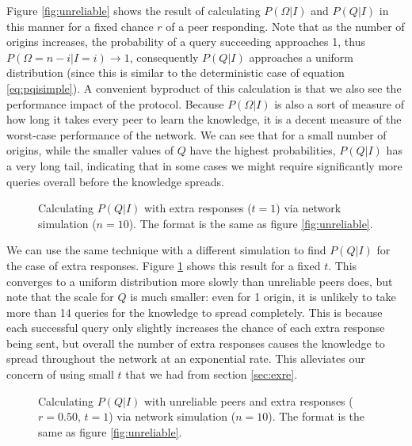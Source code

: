 \documentclass{article}
\newcommand{\eqnref}[1]{equation \eqref{eq:#1}}
\newcommand{\secref}[1]{section \ref{sec:#1}}
\newcommand{\figref}[1]{figure \ref{fig:#1}}
\newcommand{\Figref}[1]{Figure \ref{fig:#1}}
\begin{document}
\Figref{unreliable} shows the result of
calculating $P(\Omega|I)$ and $P(Q|I)$ in this manner for a fixed chance $r$ of
a peer responding. Note that as the number of origins increases, the probability
of a query succeeding approaches 1, thus $P(\Omega=n-i|I=i)\rightarrow 1$,
consequently $P(Q|I)$ approaches a uniform distribution (since this is similar
to the deterministic case of \eqnref{pqisimple}). A convenient byproduct of this
calculation is that we also see the performance impact of the protocol.
Because $P(\Omega|I)$ is also a sort of measure of how long it takes every peer
to learn the knowledge, it is a decent measure of the worst-case performance of
the network. We can see that for a small number of origins, while the smaller
values of $Q$ have the highest probabilities, $P(Q|I)$ has a very long tail,
indicating that in some cases we might require significantly more queries
overall before the knowledge spreads.

\begin{figure}%
    \centering
	\caption{Calculating $P(Q|I)$ with extra responses ($t=1$) via network
	simulation ($n=10$). The format is the same as \figref{unreliable}.}
    \label{fig:exre}%
\end{figure}

We can use the same technique with a different simulation to find $P(Q|I)$ for
the case of extra responses. \Figref{exre} shows this result for a fixed $t$.
This converges to a uniform distribution more slowly than unreliable peers does,
but note that the scale for $Q$ is much smaller: even for 1 origin, it is
unlikely to take more than 14 queries for the knowledge to spread completely.
This is because each successful query only slightly increases the chance of each
extra response being sent, but overall the number of extra responses causes the
knowledge to spread throughout the network at an exponential rate. This
alleviates our concern of using small $t$ that we had from \secref{exre}.

\begin{figure}%
    \centering
	\caption{Calculating $P(Q|I)$ with unreliable peers and extra responses
	($r=0.50$, $t=1$) via network simulation ($n=10$). The format is the same
	as \figref{unreliable}.}
    \label{fig:uexre}%
\end{figure}
\end{document}
